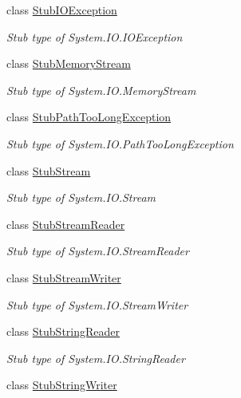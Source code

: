 \begin{DoxyCompactItemize}
class \hyperlink{class_system_1_1_i_o_1_1_fakes_1_1_stub_i_o_exception}{Stub\-I\-O\-Exception}
\begin{DoxyCompactList}\small\item\em Stub type of System.\-I\-O.\-I\-O\-Exception\end{DoxyCompactList}\item 
class \hyperlink{class_system_1_1_i_o_1_1_fakes_1_1_stub_memory_stream}{Stub\-Memory\-Stream}
\begin{DoxyCompactList}\small\item\em Stub type of System.\-I\-O.\-Memory\-Stream\end{DoxyCompactList}\item 
class \hyperlink{class_system_1_1_i_o_1_1_fakes_1_1_stub_path_too_long_exception}{Stub\-Path\-Too\-Long\-Exception}
\begin{DoxyCompactList}\small\item\em Stub type of System.\-I\-O.\-Path\-Too\-Long\-Exception\end{DoxyCompactList}\item 
class \hyperlink{class_system_1_1_i_o_1_1_fakes_1_1_stub_stream}{Stub\-Stream}
\begin{DoxyCompactList}\small\item\em Stub type of System.\-I\-O.\-Stream\end{DoxyCompactList}\item 
class \hyperlink{class_system_1_1_i_o_1_1_fakes_1_1_stub_stream_reader}{Stub\-Stream\-Reader}
\begin{DoxyCompactList}\small\item\em Stub type of System.\-I\-O.\-Stream\-Reader\end{DoxyCompactList}\item 
class \hyperlink{class_system_1_1_i_o_1_1_fakes_1_1_stub_stream_writer}{Stub\-Stream\-Writer}
\begin{DoxyCompactList}\small\item\em Stub type of System.\-I\-O.\-Stream\-Writer\end{DoxyCompactList}\item 
class \hyperlink{class_system_1_1_i_o_1_1_fakes_1_1_stub_string_reader}{Stub\-String\-Reader}
\begin{DoxyCompactList}\small\item\em Stub type of System.\-I\-O.\-String\-Reader\end{DoxyCompactList}\item 
class \hyperlink{class_system_1_1_i_o_1_1_fakes_1_1_stub_string_writer}{Stub\-String\-Writer}

\end{DoxyCompactItemize}
